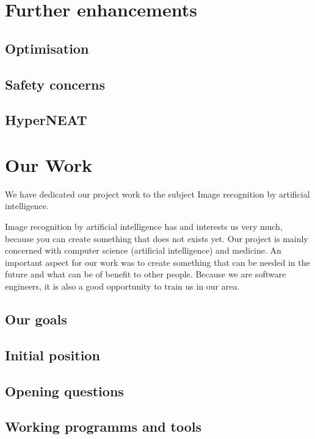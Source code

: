 \documentclass[11pt]{article}
\begin{document}
	\section{Further enhancements}
		\subsection{Optimisation}
			
		\subsection{Safety concerns}
			
		\subsection{HyperNEAT}
			
	\newpage

	\section{Our Work}
	We have dedicated our project work to the subject Image recognition by artificial intelligence.
	
	Image recognition by artificial intelligence has and interests us very much, because you can create something that does not exists yet. 
	Our project is mainly concerned with computer science (artificial intelligence) and medicine. 
	An important aspect for our work was to create something that can be needed in the future and what can be of benefit to other people. Because we are software engineers, it is also a good opportunity to train us in our area.
	
		
		\subsection{Our goals}
		
		\subsection{Initial position}
		
		\subsection{Opening questions}
		
		\subsection{Working programms and tools}
		
\end{document}
